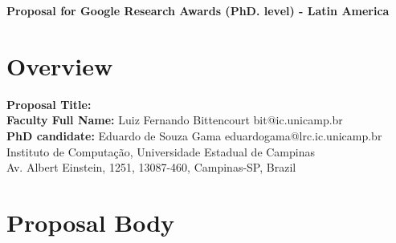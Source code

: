 \documentclass[a4paper, 11pt]{article}
\begin{document}
	\begin{center}
		{\bf Proposal for Google Research Awards (PhD. level) - Latin America}
	\end{center}

	\section{Overview}

	\noindent
	{\bf Proposal Title:} \\
	{\bf Faculty Full Name:} Luiz Fernando Bittencourt \hfill bit@ic.unicamp.br \\
	{\bf PhD candidate:} Eduardo de Souza Gama \hfill eduardogama@lrc.ic.unicamp.br \\
	Instituto de Computação, Universidade Estadual de Campinas \\
	Av. Albert Einstein, 1251, 13087-460, Campinas-SP, Brazil \\


	\section{Proposal Body}	
	
	
	
    

    
    
    
\end{document}
